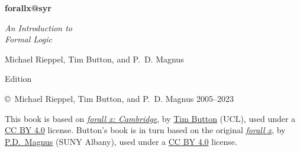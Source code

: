 \thispagestyle{empty}


    
\vspace{20pt}
    
\begin{center}
\fontsize{36pt}{36pt}\selectfont
  \textbf{forallx@syr}

\fontsize{24pt}{24pt}\selectfont
\vspace{1em}
\textit{An Introduction to\\ Formal Logic}


\vspace{40pt}

\fontsize{16pt}{18pt}\selectfont Michael Rieppel, Tim Button, and P.~D. Magnus\\

\vspace{85pt}

\fontsize{20pt}{20pt} Edition
\end{center}

\newpage


\noindent \small \copyright \ Michael Rieppel, Tim Button, and P.~D. Magnus 2005--2023

\vspace{1ex}

\noindent This book is based on \href{http://www.homepages.ucl.ac.uk/~uctytbu/forallxcam.pdf}{\emph{forall x: Cambridge}}, by  \href{http://www.homepages.ucl.ac.uk/~uctytbu}{Tim Button}
(UCL), used under a \href{https://creativecommons.org/licenses/by/4.0/}{CC BY 4.0} license.  Button's book is in turn based on the original \href{https://www.fecundity.com/logic/}{\emph{forall x}}, by
\href{https://www.fecundity.com/job/}{P.D.\ Magnus} (SUNY Albany), used under a \href{https://creativecommons.org/licenses/by/4.0/}{CC BY 4.0} license.

